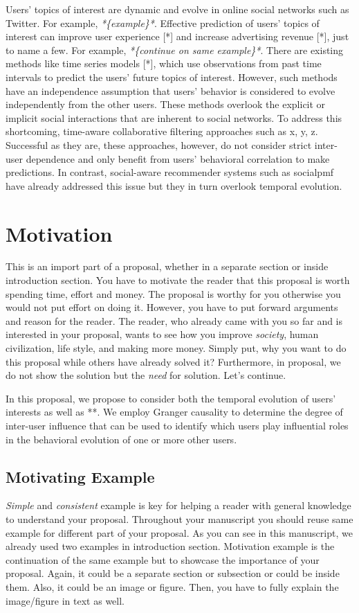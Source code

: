 \documentclass[sigconf]{acmart}
\begin{document}
Users' topics of interest are dynamic and evolve in online social networks such as  Twitter. For example, \textit{*\{example\}*}. Effective prediction of users' topics of interest can improve user experience [*] and increase advertising revenue [*], just to name a few. For example, \textit{*\{continue on same example\}*}. There are existing methods like time series models [*], which use observations from past time intervals to predict the users' future topics of interest. However, such methods have an independence assumption that users' behavior is considered to evolve independently from the other users. These methods overlook the explicit or implicit social interactions that are inherent to social networks. To address this shortcoming, time-aware collaborative filtering approaches such as x, y, z. Successful as they are, these approaches, however, do not consider strict  inter-user dependence and only benefit from users' behavioral correlation to make predictions. In contrast, social-aware recommender systems such as socialpmf~\cite{DBLP:conf/sigmod/HuYCX15} have already addressed this issue but they in turn overlook temporal evolution.
\section{Motivation}
{\color{blue}This is an import part of a proposal, whether in a separate section or inside introduction section. You have to motivate the reader that this proposal is worth spending time, effort and money. The proposal is worthy for you otherwise you would not put effort on doing it. However, you have to put forward arguments and reason for the reader. The reader, who already came with you so far and is interested in your proposal, wants to see how you improve \textit{society}, {human civilization}, {life style}, and making {more money}. Simply put, why you want to do this proposal while others have already solved it? Furthermore, in proposal, we do not show the solution but the \textit{need} for solution. Let's continue.}

In this proposal, we propose to consider both the temporal evolution of users' interests as well as **. We employ Granger causality to determine the degree of inter-user influence that can be used to identify which users play influential roles in the behavioral evolution of one or more other users.
\subsection{Motivating Example}
{\color{blue}\textit{Simple} and \textit{consistent} example is key for helping a reader with general knowledge to understand your proposal. Throughout your manuscript you should reuse same example for different part of your proposal. As you can see in this manuscript, we already used two examples in introduction section. Motivation example is the continuation of the same example but to showcase the importance of your proposal. Again, it could be a separate section or subsection or could be inside them. Also, it could be an image or figure. Then, you have to fully explain the image/figure in text as well. }
\end{document}
